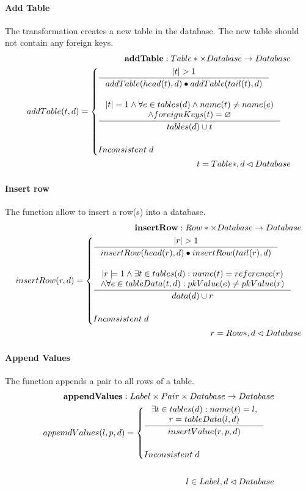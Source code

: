 \documentclass[11pt]{article}
\begin{document}
\paragraph{Add Table} The transformation creates a new table in the database. The new table should not contain any foreign keys.
\begin{align*}
	\mathbf{addTable} : Table* \times Database \rightarrow Database \\ 
	addTable(t, d) = \begin{cases}
		\inference{|t| > 1}{addTable(head(t),d) \bullet addTable(tail(t), d)}
\\ \\	
		\inference{|t| = 1 \wedge \forall e \in tables(d) \wedge name(t) \neq name(e) \\ \wedge foreignKeys(t) = \varnothing }{tables(d) \cup t}
\\ \\
		Inconsistent \;d 
	 \end{cases}\\ 
	t = Table*, d \lhd Database
\end{align*}
\paragraph{Insert row} The function allow to insert a row(s) into a database.
\begin{align*}
	\mathbf{insertRow} : Row* \times Database \rightarrow Database \\
	insertRow(r, d) = \begin{cases}
			\inference{|r|>1}{insertRow(head(r), d) \bullet insertRow(tail(r), d)} \\ \\
		 	\inference{|r|=1 \wedge \exists t \in tables(d) : name(t) = reference(r) \\ \wedge \forall e \in tableData(t, d) : pkValue(e) \neq pkValue(r)}{data(d) \cup r} \\ \\
			 Inconsistent \; d
		 \end{cases}	\\
		 r = Row*,d \lhd Database
\end{align*}
\paragraph{Append Values} The function appends a pair to all rows of a table.
\begin{align*}
	\mathbf{appendValues} : Label \times Pair \times Database \rightarrow Database \\
	appemdValues(l, p, d) = \begin{cases}
 		\inference{\exists t \in tables(d) : name(t) = l, \\ r = tableData(l, d)}{insertValue(r, p, d)} \\ \\
 		Inconsistent \; d
 	\end{cases}\\ \\
 	l \in Label, d \lhd Database
\end{align*}
\end{document}
